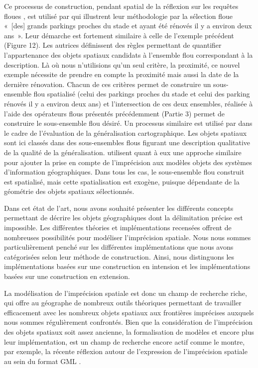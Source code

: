 Ce processus de construction, pendant spatial de la réflexion sur les
requêtes floues \textcite{Wang1994,Moreau2018}, est utilisé par
\textcite{Duraciova2017} qui illustrent leur méthodologie par la
sélection floue « [des] grands parkings proches du stade et ayant été
rénovés il y a environ deux ans ». Leur démarche est fortement
similaire à celle de l’exemple précédent (Figure 12). Les autrices
définissent des règles permettant de quantifier l’appartenance des
objets spatiaux candidats à l’ensemble flou correspondant à la
description. Là où nous n’utilisions qu’un seul critère, la proximité,
ce nouvel exemple nécessite de prendre en compte la proximité mais
aussi la date de la dernière rénovation. Chacun de ces critères permet
de construire un sous-ensemble flou spatialisé (celui des parkings
proches du stade et celui des parking rénovés il y a environ deux ans)
et l’intersection de ces deux ensembles, réalisée à l’aide des
opérateurs flous présentés précédemment (Partie 3) permet de
construire le sous-ensemble flou désiré. Un processus similaire est
utilisé par \textcite{Bard2003} dans le cadre de l’évaluation de la
généralisation cartographique. Les objets spatiaux sont ici classés
dans des sous-ensembles flous figurant une description qualitative de
la qualité de la généralisation. \textcite{Cross2000} utilisent quant
à eux une approche similaire pour ajouter la prise en compte de
l’imprécision aux modèles objets des systèmes d’information
géographiques. Dans tous les cas, le sous-ensemble flou construit est
spatialisé, mais cette spatialisation est exogène, puisque dépendante
de la géométrie des objets spatiaux sélectionnés.


Dans cet état de l’art, nous avons souhaité présenter les différents
concepts permettant de décrire les objets géographiques dont la
délimitation précise est impossible. Les différentes théories et
implémentations recensées offrent de nombreuses possibilités pour
modéliser l’imprécision spatiale. Nous nous sommes particulièrement
penché sur les différentes implémentations que nous avons catégorisées
selon leur méthode de construction. Ainsi, nous distinguons les
implémentations basées sur une construction en intension et les
implémentations basées sur une construction en extension.

La modélisation de l’imprécision spatiale est donc un champ de
recherche riche, qui offre au géographe de nombreux outils théoriques
permettant de travailler efficacement avec les nombreux objets
spatiaux aux frontières imprécises auxquels nous sommes régulièrement
confrontés. Bien que la considération de l’imprécision des objets
spatiaux soit assez ancienne, la formalisation de modèles et encore
plus leur implémentation, est un champ de recherche encore actif comme
le montre, par exemple, la récente réflexion autour de l’expression de
l’imprécision spatiale au sein du format GML \autocite{Wei2017}.



